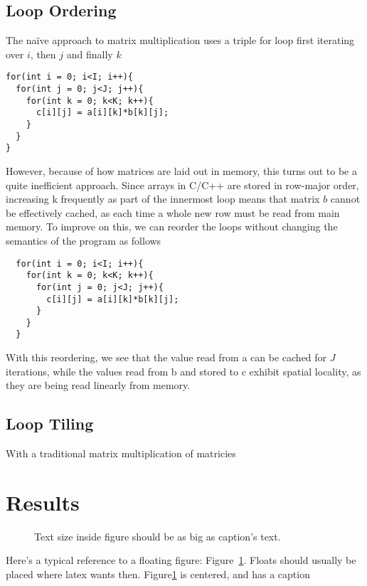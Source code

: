 \documentclass[letterpaper,twocolumn,10pt]{article}
\begin{document}
\subsection{Loop Ordering}
The na\"{i}ve approach to matrix multiplication uses a triple for loop first iterating
over $i$, then $j$ and finally $k$
\begin{verbatim}
for(int i = 0; i<I; i++){
  for(int j = 0; j<J; j++){
    for(int k = 0; k<K; k++){
      c[i][j] = a[i][k]*b[k][j];
    }
  }
}
\end{verbatim}
However, because of how matrices are laid out in memory, this turns out to be a 
quite inefficient approach. Since arrays in C/C++ are stored in row-major order,
increasing k frequently as part of the innermost loop means that matrix $b$ cannot
be effectively cached, as each time a whole new row must be read from main memory.
To improve on this, we can reorder the loops without changing the semantics of the
program as follows
\begin{verbatim}
  for(int i = 0; i<I; i++){
    for(int k = 0; k<K; k++){
      for(int j = 0; j<J; j++){
        c[i][j] = a[i][k]*b[k][j];
      }
    }
  }
  \end{verbatim}
With this reordering, we see that the value read from a can be cached for $J$ 
iterations, while the values read from b and stored to c exhibit spatial
locality, as they are being read linearly from memory.
\subsection{Loop Tiling}
With a traditional matrix multiplication of matricies 
\section{Results}
\begin{figure}
  \caption{\label{fig:vectors} Text size inside figure should be as big as
  caption's text. }
\end{figure}


Here's a typical reference to a floating figure:
Figure~\ref{fig:vectors}. Floats should usually be placed where latex
wants then. Figure\ref{fig:vectors} is centered, and has a caption
\end{document}
